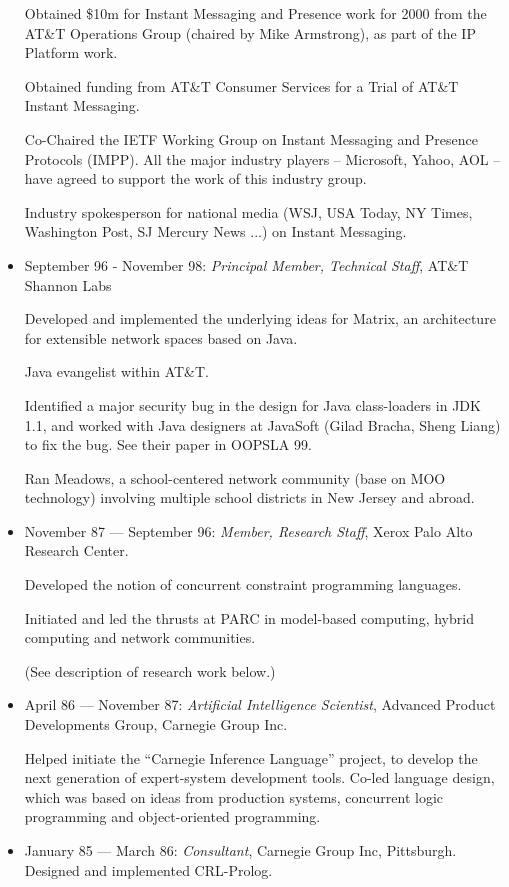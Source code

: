 \documentclass{article}
\begin{document}
\begin{itemize}
  Obtained \$10m for Instant Messaging and Presence work for 2000
  from the AT\&T Operations Group (chaired by Mike Armstrong), as
  part of the IP Platform work.
  
  Obtained funding from AT\&T Consumer Services for a Trial of AT\&T
  Instant Messaging.

  Co-Chaired the IETF Working Group on Instant Messaging and Presence
  Protocols (IMPP). All the major industry players -- Microsoft,
  Yahoo, AOL -- have agreed to support the work of this industry
  group.
   
  Industry spokesperson for national media (WSJ, USA Today, NY Times,
  Washington Post, SJ Mercury News ...) on Instant Messaging.

\item September 96 - November 98: 
  {\em Principal Member, Technical Staff}, AT\&T Shannon Labs
 
  Developed and implemented the underlying ideas for Matrix, an
  architecture for extensible network spaces based on Java. 

  Java evangelist within AT\&T. 

  Identified a major security bug in the design for Java class-loaders
  in JDK 1.1, and worked with Java designers at JavaSoft (Gilad
  Bracha, Sheng Liang) to fix the bug. See their paper in OOPSLA 99.

  Ran Meadows, a school-centered network community (base on MOO
  technology) involving multiple school districts in New Jersey
  and abroad.

\item November 87 --- September 96: 
  {\em Member, Research Staff}, Xerox Palo Alto Research Center.

  Developed the notion of concurrent constraint programming
  languages.
  
  Initiated and led the thrusts at PARC in model-based
  computing, hybrid computing and network communities.

  (See description of research work below.)

\item April 86 --- November 87: {\em Artificial Intelligence
  Scientist}, Advanced Product Developments Group, Carnegie Group Inc.

  Helped initiate the ``Carnegie Inference Language'' project,
  to develop the next generation of expert-system development
  tools.  Co-led language design, which was based on ideas from
  production systems, concurrent logic programming and
  object-oriented programming.

\item January 85 --- March 86: {\em Consultant}, Carnegie Group Inc, Pittsburgh.
 Designed and implemented CRL-Prolog.
\end{itemize}
\end{document}
